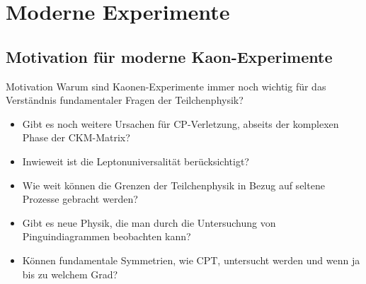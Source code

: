\documentclass[aspectratio=1610, professionalfonts, 9pt, t]{beamer}
\begin{document}
  \section{Moderne Experimente}

  \subsection{Motivation für moderne Kaon-Experimente}


  \begin{frame}{Motivation}
    Warum sind Kaonen-Experimente immer noch wichtig für das Verständnis fundamentaler Fragen der Teilchenphysik?
    \begin{itemize}
      \item Gibt es noch weitere Ursachen für CP-Verletzung, abseits der komplexen Phase der CKM-Matrix?
      \item Inwieweit ist die Leptonuniversalität berücksichtigt?
      \item Wie weit können die Grenzen der Teilchenphysik in Bezug auf seltene Prozesse gebracht werden?
      \item Gibt es neue Physik, die man durch die Untersuchung von Pinguindiagrammen beobachten kann?
      \item Können fundamentale Symmetrien, wie CPT, untersucht werden und wenn ja bis zu welchem Grad?
    \end{itemize}
  \end{frame}
\end{document}
